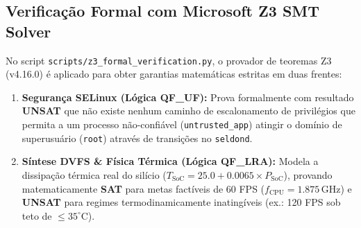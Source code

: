 \subsection{Verificação Formal com Microsoft Z3 SMT Solver}
No script \texttt{scripts/z3\_formal\_verification.py}, o provador de teoremas Z3 (v4.16.0) é aplicado para obter garantias matemáticas estritas em duas frentes:
\begin{enumerate}
    \item \textbf{Segurança SELinux (Lógica QF\_UF):} Prova formalmente com resultado \textbf{UNSAT} que não existe nenhum caminho de escalonamento de privilégios que permita a um processo não-confiável (\texttt{untrusted\_app}) atingir o domínio de superusuário (\texttt{root}) através de transições no \texttt{seldond}.
    \item \textbf{Síntese DVFS \& Física Térmica (Lógica QF\_LRA):} Modela a dissipação térmica real do silício ($T_{\text{SoC}} = 25.0 + 0.0065 \times P_{\text{SoC}}$), provando matematicamente \textbf{SAT} para metas factíveis de 60 FPS ($f_{\text{CPU}} = 1.875\,\text{GHz}$) e \textbf{UNSAT} para regimes termodinamicamente inatingíveis (ex.: 120 FPS sob teto de $\le 35^\circ\text{C}$).
\end{enumerate}

